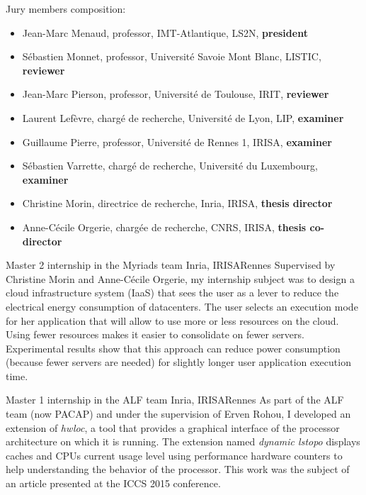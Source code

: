 \documentclass[11pt,a4paper]{moderncv}
\begin{document}
\cventry{}{}{}{}{}
  {\vspace{-2em}Jury members composition: 
  \begin{itemize}
    \item Jean-Marc Menaud, professor, IMT-Atlantique, LS2N, \textbf{president}
    \item Sébastien Monnet, professor, Université Savoie Mont Blanc, LISTIC, \textbf{reviewer}
    \item Jean-Marc Pierson, professor, Université de Toulouse, IRIT, \textbf{reviewer}
    \item Laurent Lefèvre, chargé de recherche, Université de Lyon, LIP, \textbf{examiner}
    \item Guillaume Pierre, professor, Université de Rennes 1, IRISA, \textbf{examiner}
    \item Sébastien Varrette, chargé de recherche, Université du Luxembourg, \textbf{examiner}
    \item Christine Morin, directrice de recherche, Inria, IRISA, \textbf{thesis director}
    \item Anne-Cécile Orgerie, chargée de recherche, CNRS, IRISA, \textbf{thesis co-director}
  \end{itemize}}
\vspace{0.6em}

  {Master 2 internship in the Myriads team}
  {Inria, IRISA}{Rennes}{}
  {Supervised by Christine Morin and Anne-Cécile Orgerie, my internship subject was to design a cloud infrastructure system (IaaS) that sees the user as a lever to reduce the electrical energy consumption of datacenters. The user selects an execution mode for her application that will allow to use more or less resources on the cloud. Using fewer resources makes it easier to consolidate on fewer servers. Experimental results show that this approach can reduce power consumption (because fewer servers are needed) for slightly longer user application execution time.}
\vspace{0.6em}

  {Master 1 internship in the ALF team}
  {Inria, IRISA}{Rennes}{}
  {As part of the ALF team (now PACAP) and under the supervision of Erven Rohou, I developed an extension of \textit{hwloc}, a tool that provides a graphical interface of the processor architecture on which it is running. The extension named \textit{dynamic lstopo} displays caches and CPUs current usage level using performance hardware counters to help understanding the behavior of the processor. This work was the subject of an article presented at the ICCS 2015 conference.}
\vspace{0.6em}
\end{document}
